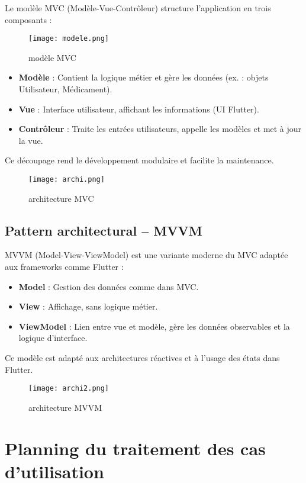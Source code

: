 \documentclass[12pt,a4paper]{report}
\begin{document}
Le modèle MVC (Modèle-Vue-Contrôleur) structure l’application en trois composants :
\begin{figure}[H] 
    \centering
    \texttt{[image: modele.png]}
    \caption{modèle MVC}
    \label{fig:modeleMVC}
\end{figure}
\begin{itemize}
    \item \textbf{Modèle} : Contient la logique métier et gère les données (ex. : objets Utilisateur, Médicament).
    \item \textbf{Vue} : Interface utilisateur, affichant les informations (UI Flutter).
    \item \textbf{Contrôleur} : Traite les entrées utilisateurs, appelle les modèles et met à jour la vue.
\end{itemize}

Ce découpage rend le développement modulaire et facilite la maintenance.
\begin{figure}[H] 
    \centering
    \texttt{[image: archi.png]}
    \caption{architecture MVC}
    \label{fig:archiMVC}
\end{figure}
\subsection{Pattern architectural – MVVM}

MVVM (Model-View-ViewModel) est une variante moderne du MVC adaptée aux frameworks comme Flutter :

\begin{itemize}
    \item \textbf{Model} : Gestion des données comme dans MVC.
    \item \textbf{View} : Affichage, sans logique métier.
    \item \textbf{ViewModel} : Lien entre vue et modèle, gère les données observables et la logique d’interface.
\end{itemize}

Ce modèle est adapté aux architectures réactives et à l’usage des états dans Flutter.
\begin{figure}[H] 
    \centering
    \texttt{[image: archi2.png]}
    \caption{architecture MVVM}
    \label{fig:archiMVVM}
\end{figure}
\section{Planning du traitement des cas d’utilisation}
\end{document}
